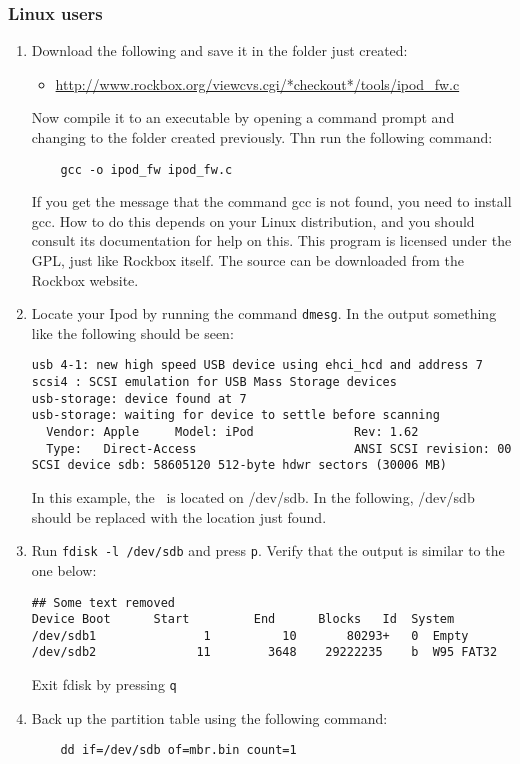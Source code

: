 \subsubsection{Linux users}
\begin{enumerate}
  \item Download the following and save it in the folder just
    created:
    \begin{itemize}
      \item \url{http://www.rockbox.org/viewcvs.cgi/*checkout*/tools/ipod_fw.c}
    \end{itemize}
    Now compile it to an executable by opening a command prompt and changing
    to the folder created previously. Thn run the following command:
    \begin{verbatim}
    gcc -o ipod_fw ipod_fw.c
    \end{verbatim}
    If you get the message that the command gcc is not found, you need to
    install gcc. How to do this depends on your Linux distribution, and
    you should consult its documentation for help on this.
    This program is licensed under the GPL, just like Rockbox itself. The
    source can be downloaded from the Rockbox website.
  \item Locate your Ipod by running the command \verb|dmesg|. In the output
    something like the following should be seen:
\begin{verbatim}
usb 4-1: new high speed USB device using ehci_hcd and address 7
scsi4 : SCSI emulation for USB Mass Storage devices
usb-storage: device found at 7
usb-storage: waiting for device to settle before scanning
  Vendor: Apple     Model: iPod              Rev: 1.62
  Type:   Direct-Access                      ANSI SCSI revision: 00
SCSI device sdb: 58605120 512-byte hdwr sectors (30006 MB)
\end{verbatim}
    In this example, the \dap\ is located on /dev/sdb. In the following,
    /dev/sdb should be replaced with the location just found.
  \item Run \verb|fdisk -l /dev/sdb| and press \verb|p|. Verify that the
    output is similar to the one below:
    \begin{verbatim}
## Some text removed
Device Boot      Start         End      Blocks   Id  System
/dev/sdb1               1          10       80293+   0  Empty
/dev/sdb2              11        3648    29222235    b  W95 FAT32
    \end{verbatim}
    Exit fdisk by pressing \verb|q|
  \item Back up the partition table using the following command:
    \begin{verbatim}
    dd if=/dev/sdb of=mbr.bin count=1
    \end{verbatim}


\end{enumerate}
